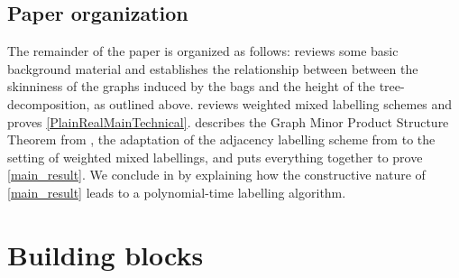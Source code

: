 \documentclass{patmorin}
\newcommand{\calG}{\mathcal{G}}
\begin{document}

\subsection{Paper organization}

  The remainder of the paper is organized as follows:   reviews some basic background material and establishes the relationship between between the skinniness of the graphs induced by the bags and the height of the tree-decomposition, as outlined above.    reviews weighted mixed labelling schemes and proves \cref{PlainRealMainTechnical}.  describes the Graph Minor Product Structure Theorem from \cite{dujmovic.joret.ea:planar}, the adaptation of the adjacency labelling scheme from \cite{dujmovic.esperet.ea:adjacency} to the setting of weighted mixed labellings, and puts everything together to prove \cref{main_result}. We conclude in  by explaining how the constructive nature of \cref{main_result} leads to a
polynomial-time labelling algorithm.

  \section{Building blocks}\label{building_blocks}
\end{document}
